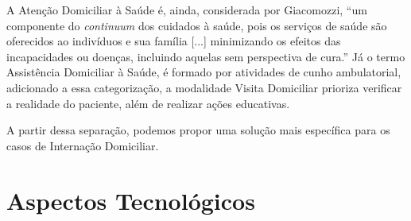 A Atenção Domiciliar à Saúde é, ainda, considerada por Giacomozzi, ``um
componente do \textit{continuum} dos cuidados à saúde, pois os serviços de
saúde são oferecidos ao indivíduos e sua família [...] minimizando os efeitos
das incapacidades ou doenças, incluindo aquelas sem perspectiva de cura.''
Já o termo Assistência Domiciliar à Saúde, é formado por atividades de cunho 
ambulatorial, adicionado a essa categorização, a modalidade Visita Domiciliar
prioriza verificar a realidade do paciente, além de realizar ações educativas.  

A partir dessa separação, podemos propor uma solução mais específica para os 
casos de Internação Domiciliar.



\section{Aspectos Tecnológicos}\label{sec:aspectos-tecnologicos}
